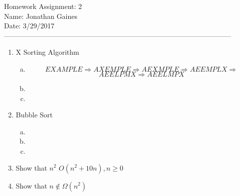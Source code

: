 \documentclass[12pt]{article}
\begin{document}
Homework Assignment: 2\\ 
Name: Jonathan Gaines\\ 
Date: 3/29/2017\\ --------------------------------------------------------------------------------------------------
\begin {enumerate}
\item X Sorting Algorithm
	\begin {enumerate}[(a)]
		\item
		$$EXAMPLE\Rightarrow 
			AXEMPLE\Rightarrow	
			AEXMPLE\Rightarrow
			AEEMPLX\Rightarrow$$ 
		$$AEELPMX\Rightarrow
			AEELMPX $$		
		\item
		\item 
	\end {enumerate}
\item Bubble Sort
	\begin {enumerate}[(a)]
		\item
		\item
		\item
	\end {enumerate}
\item Show that $n^{2}$ \in $O(n^{2}+10n), n \geq 0$

\item Show that $n \not\in \Omega(n^{2})$

\end {enumerate}
\end{document}

